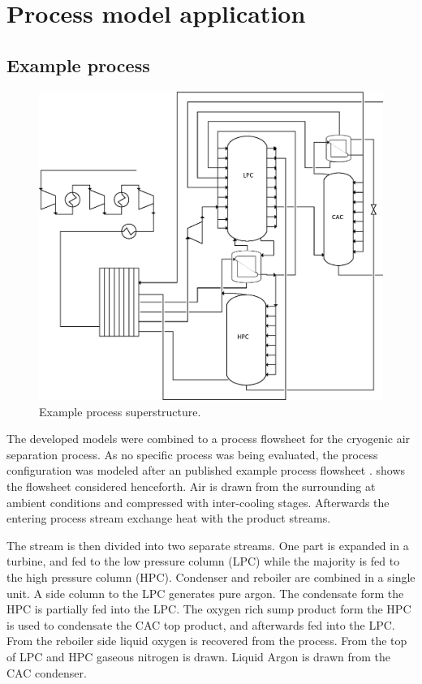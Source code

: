 \chapter{Process model application}
\label{chp:processmodelapp}

    \section{Example process}
        \begin{figure}
            \footnotesize
            \center
            \includegraphics[width=\linewidth]{Pictures/ASU_superstructure}
            \caption{Example process superstructure.}
            \label{fig:opt:exppro}
        \end{figure}

        The developed models were combined to a process flowsheet for the cryogenic air separation process.
        As no specific process was being evaluated, the process configuration was modeled after an
        published example process flowsheet \cite{Kooijman.}. 
        shows the flowsheet considered henceforth. Air is drawn from the surrounding at ambient conditions
        and compressed with inter-cooling stages. Afterwards the entering process stream exchange heat
        with the product streams.

        The stream is then divided into two separate streams. One part is expanded in a turbine, and fed to
        the low pressure column (LPC) while the majority is fed to the high pressure column (HPC).
        Condenser and reboiler are combined in a single unit. A side column to the LPC generates pure
        argon. The condensate form the HPC is partially fed into the LPC. The oxygen rich sump product form the HPC
        is used to condensate the CAC top product, and afterwards fed into the LPC. From the reboiler side liquid oxygen
        is recovered from the process. From the top of LPC and HPC gaseous nitrogen is drawn. Liquid Argon is drawn from 
        the CAC condenser. 
        
